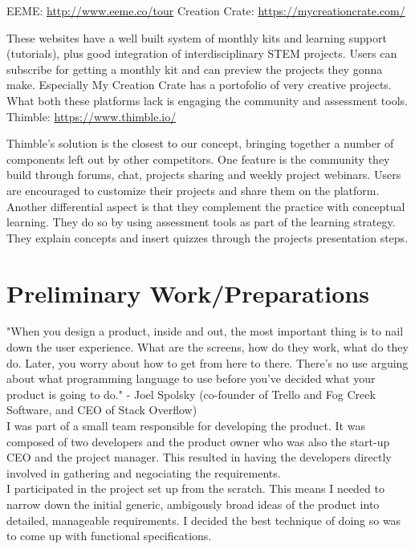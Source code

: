EEME: \url{http://www.eeme.co/tour}
Creation Crate: \url{https://mycreationcrate.com/}

These websites have a well built system of monthly kits and learning support (tutorials), plus good integration of interdisciplinary STEM projects. Users can subscribe for getting a monthly kit and can preview the projects they gonna make. Especially My Creation Crate has a portofolio of very creative projects.
What both these platforms lack is engaging the community and assessment tools.\\

Thimble: \url{https://www.thimble.io/}

Thimble's solution is the closest to our concept, bringing together a number of components left out by other competitors. 
One feature is the community they build through forums, chat, projects sharing and weekly project webinars. Users are encouraged to customize their projects and share them on the platform. 
Another differential aspect is that they complement the practice with conceptual learning. They do so by using assessment tools as part of the learning strategy. They explain concepts and insert quizzes through the projects presentation steps.\\


\section{Preliminary Work/Preparations}

"When you design a product, inside and out, the most important thing is to nail down the user experience. What are the screens, how do they work, what do they do. Later, you worry about how to get from here to there. There's no use arguing about what programming language to use before you've decided what your product is going to do." - Joel Spolsky (co-founder of Trello and Fog Creek Software, and CEO of Stack Overflow)\\

I was part of a small team responsible for developing the product. It was composed of two developers and the product owner who was also the start-up CEO and the project manager. This resulted in having the developers directly involved in gathering and negociating the requirements.\\

I participated in the project set up from the scratch. This means I needed to narrow down the initial generic, ambigously broad ideas of the product into detailed, manageable requirements. I decided the best technique of doing so was to come up with functional specifications.\\

